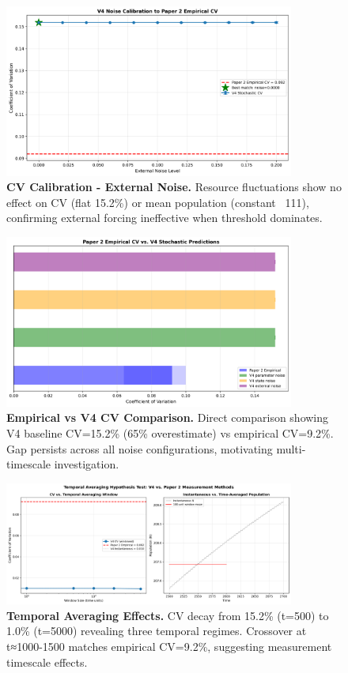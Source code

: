 \documentclass[
]{article}
\begin{document}
\begin{figure}[htbp]
\centering
\includegraphics[width=0.85\textwidth]{figures/paper7_fig13_cv_calibration_external.png}
\caption{\textbf{CV Calibration - External Noise.} Resource fluctuations show no effect on CV (flat 15.2\%) or mean population (constant ~111), confirming external forcing ineffective when threshold dominates.}
\label{fig:cv-external}
\end{figure}

\begin{figure}[htbp]
\centering
\includegraphics[width=0.85\textwidth]{figures/paper7_fig14_empirical_vs_v4.png}
\caption{\textbf{Empirical vs V4 CV Comparison.} Direct comparison showing V4 baseline CV=15.2\% (65\% overestimate) vs empirical CV=9.2\%. Gap persists across all noise configurations, motivating multi-timescale investigation.}
\label{fig:empirical-comparison}
\end{figure}

\begin{figure}[htbp]
\centering
\includegraphics[width=0.85\textwidth]{figures/paper7_fig15_temporal_averaging.png}
\caption{\textbf{Temporal Averaging Effects.} CV decay from 15.2\% (t=500) to 1.0\% (t=5000) revealing three temporal regimes. Crossover at t≈1000-1500 matches empirical CV=9.2\%, suggesting measurement timescale effects.}
\label{fig:temporal-averaging}
\end{figure}
\end{document}
